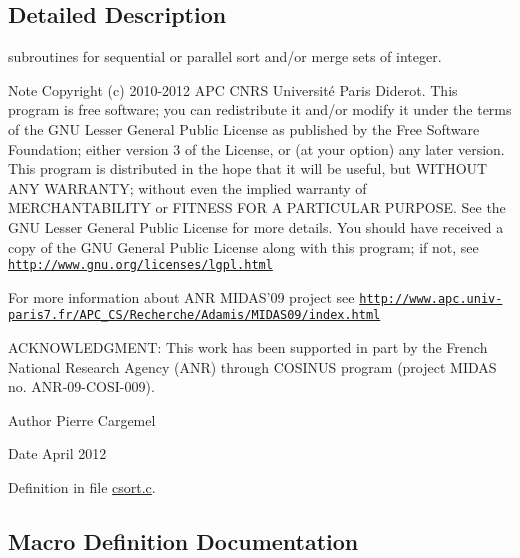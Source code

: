 \subsection{Detailed Description}
subroutines for sequential or parallel sort and/or merge sets of integer. \begin{DoxyNote}{Note}
Copyright (c) 2010-\/2012 A\-P\-C C\-N\-R\-S Université Paris Diderot. This program is free software; you can redistribute it and/or modify it under the terms of the G\-N\-U Lesser General Public License as published by the Free Software Foundation; either version 3 of the License, or (at your option) any later version. This program is distributed in the hope that it will be useful, but W\-I\-T\-H\-O\-U\-T A\-N\-Y W\-A\-R\-R\-A\-N\-T\-Y; without even the implied warranty of M\-E\-R\-C\-H\-A\-N\-T\-A\-B\-I\-L\-I\-T\-Y or F\-I\-T\-N\-E\-S\-S F\-O\-R A P\-A\-R\-T\-I\-C\-U\-L\-A\-R P\-U\-R\-P\-O\-S\-E. See the G\-N\-U Lesser General Public License for more details. You should have received a copy of the G\-N\-U General Public License along with this program; if not, see \href{http://www.gnu.org/licenses/lgpl.html}{\tt http\-://www.\-gnu.\-org/licenses/lgpl.\-html} 

For more information about A\-N\-R M\-I\-D\-A\-S'09 project see \href{http://www.apc.univ-paris7.fr/APC_CS/Recherche/Adamis/MIDAS09/index.html}{\tt http\-://www.\-apc.\-univ-\/paris7.\-fr/\-A\-P\-C\-\_\-\-C\-S/\-Recherche/\-Adamis/\-M\-I\-D\-A\-S09/index.\-html} 

A\-C\-K\-N\-O\-W\-L\-E\-D\-G\-M\-E\-N\-T\-: This work has been supported in part by the French National Research Agency (A\-N\-R) through C\-O\-S\-I\-N\-U\-S program (project M\-I\-D\-A\-S no. A\-N\-R-\/09-\/\-C\-O\-S\-I-\/009). 
\end{DoxyNote}
\begin{DoxyAuthor}{Author}
Pierre Cargemel 
\end{DoxyAuthor}
\begin{DoxyDate}{Date}
April 2012 
\end{DoxyDate}


Definition in file \hyperlink{csort_8c_source}{csort.\-c}.



\subsection{Macro Definition Documentation}
